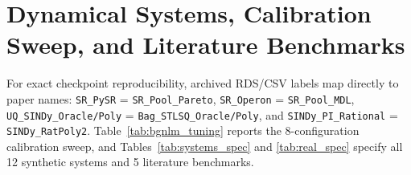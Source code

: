 \documentclass{article}
\begin{document}
\clearpage



\clearpage
\appendix

\section{Dynamical Systems, Calibration Sweep, and Literature Benchmarks}
\label{app:systems}

For exact checkpoint reproducibility, archived RDS/CSV labels map directly to paper names: \texttt{SR\_PySR} = \texttt{SR\_Pool\_Pareto}, \texttt{SR\_Operon} = \texttt{SR\_Pool\_MDL}, \texttt{UQ\_SINDy\_Oracle/Poly} = \texttt{Bag\_STLSQ\_Oracle/Poly}, and \texttt{SINDy\_PI\_Rational} = \texttt{SINDy\_RatPoly2}. Table~\ref{tab:bgnlm_tuning} reports the 8-configuration calibration sweep, and Tables~\ref{tab:systems_spec} and \ref{tab:real_spec} specify all 12 synthetic systems and 5 literature benchmarks.

\begin{table}[t]
\centering
\caption{Systematic BGNLM tuning on the 6-task calibration slice ($N=250$, $\sigma \in \{0.01,0.25\}$). Locked optimum: \texttt{C04}.}
\label{tab:bgnlm_tuning}
\scriptsize
{}
\end{table}
\end{document}
